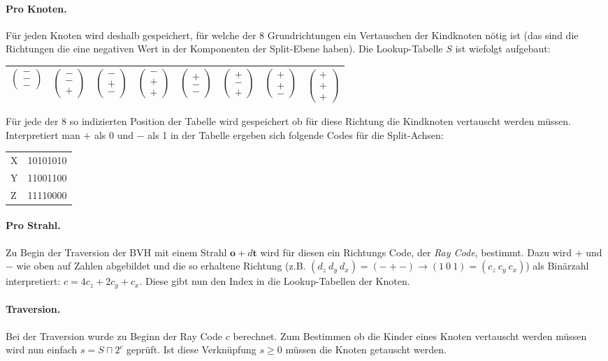 \documentclass[a4paper,11pt]{article}
\begin{document}
\paragraph{Pro Knoten.}
Für jeden Knoten wird deshalb gespeichert, für welche der 8 Grundrichtungen ein Vertauschen der Kindknoten nötig ist 
	(das sind die Richtungen die eine negativen Wert in der Komponenten der Split-Ebene haben).
Die Lookup-Tabelle $S$ ist wiefolgt aufgebaut:
\newcommand\tmp[3]{$\left(\begin{array}{c}#1\\#2\\#3\end{array}\right)$}
{\tiny \begin{center}\begin{tabular}{|cccccccc|}
\hline
\tmp{-}{-}{-} & \tmp{-}{-}{+} & \tmp{-}{+}{-} & \tmp{-}{+}{+} &
\tmp{+}{-}{-} & \tmp{+}{-}{+} & \tmp{+}{+}{-} & \tmp{+}{+}{+} \\
\hline
\end{tabular}\end{center}}

Für jede der 8 so indizierten Position der Tabelle wird gespeichert ob für diese Richtung die Kindknoten vertauscht werden müssen.
Interpretiert man $+$ als 0 und $-$ als 1 in der Tabelle ergeben sich folgende Codes für die Split-Achsen:
\begin{center}\begin{tabular}{lr}
X & 10101010\\
Y & 11001100\\
Z & 11110000\\
\end{tabular}\end{center}


\paragraph{Pro Strahl.}
Zu Begin der Traversion der BVH mit einem Strahl $\mathbf{o}+d\mathbf{t}$ wird für diesen ein Richtungs Code, der \emph{Ray Code}, bestimmt.
Dazu wird $+$ und $-$ wie oben auf Zahlen abgebildet und die so erhaltene Richtung (z.B. $(d_z\ d_y\ d_x)=(- + -) \to (1\ 0\ 1)=(c_z\ c_y\ c_x)$) 
	als Binärzahl interpretiert: $c = 4c_z+2c_y+c_x$.
Diese gibt nun den Index in die Lookup-Tabellen der Knoten.

\paragraph{Traversion.}
Bei der Traversion wurde zu Beginn der Ray Code $c$ berechnet.
Zum Bestimmen ob die Kinder eines Knoten vertauscht werden müssen wird nun einfach $s = S\sqcap 2^c$ geprüft. 
Ist diese Verknüpfung $s\ge0$ müssen die Knoten getauscht werden.
\end{document}
